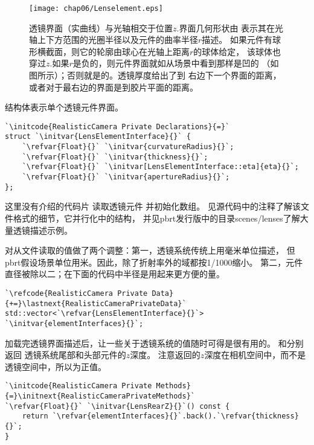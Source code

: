 \begin{figure}[htbp]
    \centering\texttt{[image: chap06/Lenselement.eps]}
    \caption{透镜界面（实曲线）与光轴相交于位置$z$.界面几何形状由
        表示其在光轴上下方范围的光圈半径以及元件的曲率半径$r$描述。
        如果元件有球形横截面，则它的轮廓由球心在光轴上距离$r$的球体给定，
        该球体也穿过$z$.如果$r$是负的，则元件界面就如从场景中看到那样是凹的
        （如图所示）；否则就是\protect{}的。透镜厚度给出了到
        右边下一个界面的距离，或者对于最右边的界面是到胶片平面的距离。}
    \label{fig:6.17}
\end{figure}

结构体表示单个透镜元件界面。
\begin{lstlisting}
`\initcode{RealisticCamera Private Declarations}{=}`
struct `\initvar{LensElementInterface}{}` {
    `\refvar{Float}{}` `\initvar{curvatureRadius}{}`;
    `\refvar{Float}{}` `\initvar{thickness}{}`;
    `\refvar{Float}{}` `\initvar[LensElementInterface::eta]{eta}{}`;
    `\refvar{Float}{}` `\initvar{apertureRadius}{}`;
};
\end{lstlisting}

这里没有介绍的代码片
读取透镜元件
并初始化数组。
见源代码中的注释了解该文件格式的细节，它并行化中的结构，
并见pbrt发行版中的目录{\ttfamily scenes/lenses}了解大量透镜描述示例。

对从文件读取的值做了两个调整：第一，透镜系统传统上用毫米单位描述，
但pbrt假设场景单位用米。因此，除了折射率外的域都按1/1000缩小。
第二，元件直径被除以二；在下面的代码中半径是用起来更方便的量。
\begin{lstlisting}
`\refcode{RealisticCamera Private Data}{+=}\lastnext{RealisticCameraPrivateData}`
std::vector<`\refvar{LensElementInterface}{}`> `\initvar{elementInterfaces}{}`;
\end{lstlisting}

加载完透镜界面描述后，让一些关于透镜系统的值随时可得是很有用的。
和分别返回
透镜系统尾部和头部元件的$z$深度。
注意返回的$z$深度在相机空间中，而不是透镜空间中，所以为正值。
\begin{lstlisting}
`\initcode{RealisticCamera Private Methods}{=}\initnext{RealisticCameraPrivateMethods}`
`\refvar{Float}{}` `\initvar{LensRearZ}{}`() const {
    return `\refvar{elementInterfaces}{}`.back().`\refvar{thickness}{}`;
}
\end{lstlisting}

